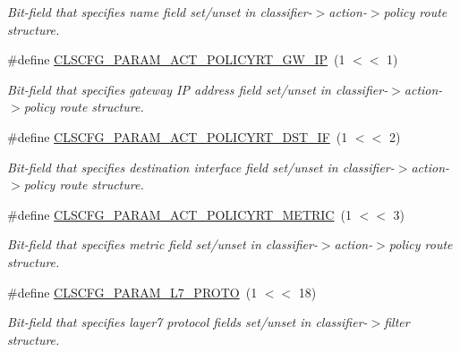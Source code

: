\begin{DoxyCompactItemize}
\begin{DoxyCompactList}\small\item\em Bit-\/field that specifies name field set/unset in classifier-\/$>$action-\/$>$policy route structure. \end{DoxyCompactList}\item 
\hypertarget{group__FAPI__QOS__CLASS_ga04076d7def16a0887142ca8a3624be06}{\#define \hyperlink{group__FAPI__QOS__CLASS_ga04076d7def16a0887142ca8a3624be06}{C\-L\-S\-C\-F\-G\-\_\-\-P\-A\-R\-A\-M\-\_\-\-A\-C\-T\-\_\-\-P\-O\-L\-I\-C\-Y\-R\-T\-\_\-\-G\-W\-\_\-\-I\-P}~(1 $<$$<$ 1)}\label{group__FAPI__QOS__CLASS_ga04076d7def16a0887142ca8a3624be06}

\begin{DoxyCompactList}\small\item\em Bit-\/field that specifies gateway I\-P address field set/unset in classifier-\/$>$action-\/$>$policy route structure. \end{DoxyCompactList}\item 
\hypertarget{group__FAPI__QOS__CLASS_ga177564364677ce11f27a8aeee185fa6b}{\#define \hyperlink{group__FAPI__QOS__CLASS_ga177564364677ce11f27a8aeee185fa6b}{C\-L\-S\-C\-F\-G\-\_\-\-P\-A\-R\-A\-M\-\_\-\-A\-C\-T\-\_\-\-P\-O\-L\-I\-C\-Y\-R\-T\-\_\-\-D\-S\-T\-\_\-\-I\-F}~(1 $<$$<$ 2)}\label{group__FAPI__QOS__CLASS_ga177564364677ce11f27a8aeee185fa6b}

\begin{DoxyCompactList}\small\item\em Bit-\/field that specifies destination interface field set/unset in classifier-\/$>$action-\/$>$policy route structure. \end{DoxyCompactList}\item 
\hypertarget{group__FAPI__QOS__CLASS_ga5c363c3cac4c58f9f7b1c71e2ecd9e9e}{\#define \hyperlink{group__FAPI__QOS__CLASS_ga5c363c3cac4c58f9f7b1c71e2ecd9e9e}{C\-L\-S\-C\-F\-G\-\_\-\-P\-A\-R\-A\-M\-\_\-\-A\-C\-T\-\_\-\-P\-O\-L\-I\-C\-Y\-R\-T\-\_\-\-M\-E\-T\-R\-I\-C}~(1 $<$$<$ 3)}\label{group__FAPI__QOS__CLASS_ga5c363c3cac4c58f9f7b1c71e2ecd9e9e}

\begin{DoxyCompactList}\small\item\em Bit-\/field that specifies metric field set/unset in classifier-\/$>$action-\/$>$policy route structure. \end{DoxyCompactList}\item 
\hypertarget{group__FAPI__QOS__CLASS_ga5dc738a7d5021a3c639b5b8a9fa9237a}{\#define \hyperlink{group__FAPI__QOS__CLASS_ga5dc738a7d5021a3c639b5b8a9fa9237a}{C\-L\-S\-C\-F\-G\-\_\-\-P\-A\-R\-A\-M\-\_\-\-L7\-\_\-\-P\-R\-O\-T\-O}~(1 $<$$<$ 18)}\label{group__FAPI__QOS__CLASS_ga5dc738a7d5021a3c639b5b8a9fa9237a}

\begin{DoxyCompactList}\small\item\em Bit-\/field that specifies layer7 protocol fields set/unset in classifier-\/$>$filter structure. \end{DoxyCompactList}\end{DoxyCompactItemize}
